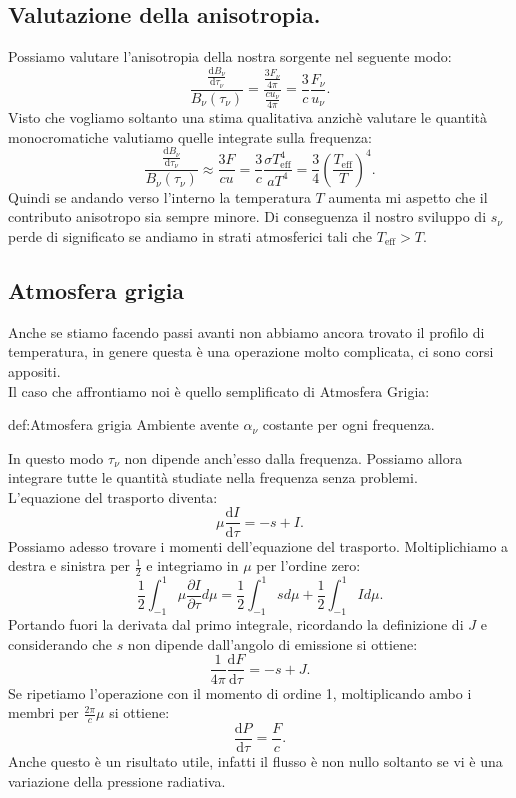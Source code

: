 \subsection{Valutazione della anisotropia.}%
Possiamo valutare l'anisotropia della nostra sorgente nel seguente modo:
\[
	\frac{\frac{\mbox{d} B_{\nu} }{\mbox{d} \tau _{\nu} } }{B_{\nu} ( \tau _{\nu} ) } = \frac{\frac{3F_{\nu} }{4\pi}}{\frac{cu_{\nu} }{4\pi}}= \frac{3}{c}\frac{F_{\nu} }{u_{\nu} }
.\] 
Visto che vogliamo soltanto una stima qualitativa anzichè valutare le quantità monocromatiche valutiamo quelle integrate sulla frequenza:
\[
	\frac{\frac{\mbox{d} B_{\nu} }{\mbox{d} \tau _{\nu} } }{B_{\nu} ( \tau _{\nu} ) } \approx \frac{3F}{c u} = \frac{3}{c} \frac{\sigma T_{\text{eff}}^{4}}{aT^{4}} = \frac{3}{4}\left( \frac{T_{\text{eff}}}{T} \right) ^{4}
.\] 
Quindi se andando verso l'interno la temperatura $T$ aumenta mi aspetto che il contributo anisotropo sia sempre minore. Di conseguenza il nostro sviluppo di $s_{\nu} $ perde di significato se andiamo in strati atmosferici tali che $T_{\text{eff}} > T$.
\subsection{Atmosfera grigia}%
Anche se stiamo facendo passi avanti non abbiamo ancora trovato il profilo di temperatura, in genere questa è una operazione molto complicata, ci sono corsi appositi. \\
Il caso che affrontiamo noi è quello semplificato di Atmosfera Grigia:
\begin{defn}{def:Atmosfera grigia}
	Ambiente avente $\alpha _{\nu} $ costante per ogni frequenza.
\end{defn}
In questo modo $\tau _{\nu} $ non dipende anch'esso dalla frequenza. Possiamo allora integrare tutte le quantità studiate nella frequenza senza problemi.\\
L'equazione del trasporto diventa:
\[
	\mu \frac{\mbox{d} I}{\mbox{d} \tau } = - s + I \label{eq:trasport-parallel-plane}
.\] 
Possiamo adesso trovare i momenti dell'equazione del trasporto. Moltiplichiamo a destra e sinistra per $\frac{1}{2}$ e integriamo in $\mu $ per l'ordine zero:
\[
	\frac{1}{2}\int_{-1}^{1} \mu \frac{\partial I}{\partial \tau } d\mu  = \frac{1}{2} \int_{-1}^{1} sd\mu + \frac{1}{2}\int_{-1}^{1} I d\mu  
.\] 
Portando fuori la derivata dal primo integrale, ricordando la definizione di $J$ e considerando che $s$ non dipende dall'angolo di emissione si ottiene:
\[
	\frac{1}{4\pi} \frac{\mbox{d} F}{\mbox{d} \tau }  = - s + J \label{eq:flux_0}
.\] 
Se ripetiamo l'operazione con il momento di ordine 1, moltiplicando ambo i membri per $\frac{2\pi}{c} \mu $ si ottiene:
\[
	\frac{\mbox{d} P}{\mbox{d} \tau } = \frac{F}{c}
.\] 
Anche questo è un risultato utile, infatti il flusso è non nullo soltanto se vi è una variazione della pressione radiativa.
